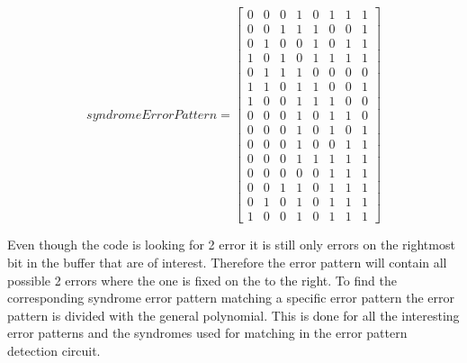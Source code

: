 \documentclass[Main]{subfiles}
\begin{document}
\begin{equation}
\label{lst:syndromeErrorPattern}
syndromeErrorPattern = 
\begin{bmatrix}
     0 &    0 &    0 &    1 &    0 &    1 &    1  &   1\\
     0 &    0 &    1 &    1 &    1 &    0 &    0  &   1\\
     0 &    1 &    0 &    0 &    1 &    0 &    1  &   1\\
     1 &    0 &    1 &    0 &    1 &    1 &    1  &   1\\
     0 &    1 &    1 &    1 &    0 &    0 &    0  &   0\\
     1 &    1 &    0 &    1 &    1 &    0 &    0  &   1\\
     1 &    0 &    0 &    1 &    1 &    1 &    0  &   0\\
     0 &    0 &    0 &    1 &    0 &    1 &    1  &   0\\
     0 &    0 &    0 &    1 &    0 &    1 &    0  &   1\\
     0 &    0 &    0 &    1 &    0 &    0 &    1  &   1\\
     0 &    0 &    0 &    1 &    1 &    1 &    1  &   1\\
     0 &    0 &    0 &    0 &    0 &    1 &    1  &   1\\
     0 &    0 &    1 &    1 &    0 &    1 &    1  &   1\\
     0 &    1 &    0 &    1 &    0 &    1 &    1  &   1\\
     1 &    0 &    0 &    1 &    0 &    1 &    1  &   1
\end{bmatrix}
\end{equation}

Even though the code is looking for 2 error it is still only errors on the rightmost bit in the buffer that are of interest.
Therefore the error pattern will contain all possible 2 errors where the one is fixed on the to the right.
To find the corresponding syndrome error pattern matching a specific error pattern the error pattern is divided with the general polynomial.
This is done for all the interesting error patterns and the syndromes used for matching in the error pattern detection circuit.
\end{document}
